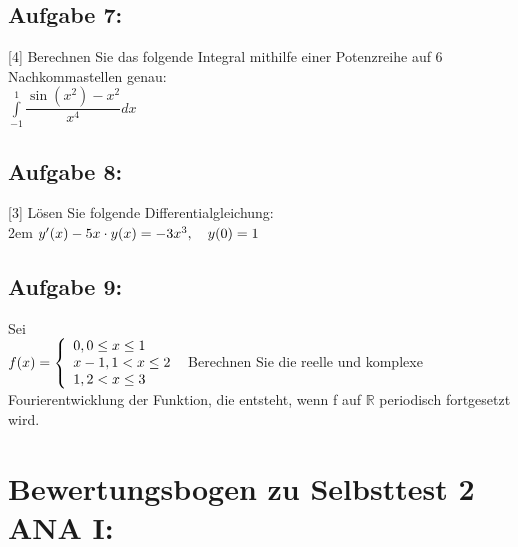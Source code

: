 \documentclass[11pt,final]{scrreprt}
\newcommand{\br} {\medskip\\}
\newcommand{\R} {\mathbb R}
\begin{document}
\subsection*{Aufgabe 7:}
[4] Berechnen Sie das folgende Integral mithilfe einer Potenzreihe auf 6 Nachkommastellen genau:\\
\hspace*{2em} $\int\limits_{-1}^1 \dfrac{\sin(x^2)-x^2}{x^4} dx $\br

\subsection*{Aufgabe 8:}

[3] Lösen Sie folgende Differentialgleichung:\\

\begingroup
\leftskip2em 
$ y'(x)-5x\cdot y(x) = -3x^3, \hspace*{1em} y(0)=1 $\\
\par	
\endgroup 

\subsection*{Aufgabe 9:}
\bigskip
[5] Sei\\
$
f(x) = \left\{
\begin{array}{l}
0, 0\leq x\leq 1 \\ 
x-1, 1 < x\leq 2 \\
1, 2 < x\leq 3 \\
\end{array}
\right.\\\\
$
Berechnen Sie die reelle und komplexe Fourierentwicklung der Funktion, die entsteht, wenn f auf $\R$ periodisch fortgesetzt wird.\br

\newpage
\section*{Bewertungsbogen zu Selbsttest 2 ANA I:}
\end{document}
